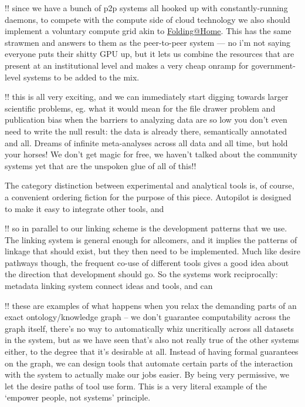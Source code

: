 \documentclass[10pt]{tufte-book}
\begin{document}
!! since we have a bunch of p2p systems all hooked up with
constantly-running daemons, to compete with the compute side of cloud
technology we also should implement a voluntary compute grid akin to
\href{https://foldingathome.org/}{Folding@Home}. This has the same
strawmen and answers to them as the peer-to-peer system --- no i'm not
saying everyone puts their shitty GPU up, but it lets us combine the
resources that are present at an institutional level and makes a very
cheap onramp for government-level systems to be added to the mix.

!! this is all very exciting, and we can immediately start digging
towards larger scientific problems, eg. what it would mean for the file
drawer problem and publication bias when the barriers to analyzing data
are so low you don't even need to write the null result: the data is
already there, semantically annotated and all. Dreams of infinite
meta-analyses across all data and all time, but hold your horses! We
don't get magic for free, we haven't talked about the community systems
yet that are the unspoken glue of all of this!!

The category distinction between experimental and analytical tools is,
of course, a convenient ordering fiction for the purpose of this piece.
Autopilot is designed to make it easy to integrate other tools, and \citep{kaneRealtimeLowlatencyClosedloop2020} 

!! so in parallel to our linking scheme is the development patterns that
we use. The linking system is general enough for allcomers, and it
implies the patterns of linkage that should exist, but they then need to
be implemented. Much like desire pathways though, the frequent co-use of
different tools gives a good idea about the direction that development
should go. So the systems work reciprocally: metadata linking system
connect ideas and tools, and can

!! these are examples of what happens when you relax the demanding parts
of an exact ontology/knowledge graph -- we don't guarantee computability
across the graph itself, there's no way to automatically whiz
uncritically across all datasets in the system, but as we have seen
that's also not really true of the other systems either, to the degree
that it's desirable at all. Instead of having formal guarantees on the
graph, we can design tools that automate certain parts of the
interaction with the system to actually make our jobs easier. By being
very permissive, we let the desire paths of tool use form. This is a
very literal example of the `empower people, not systems' principle.
\end{document}
